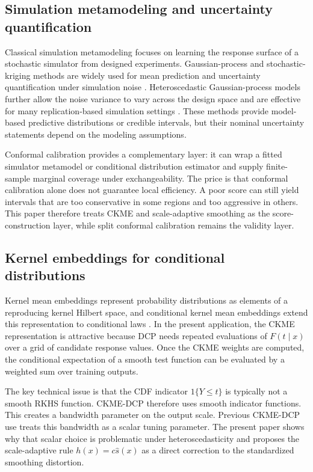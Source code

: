 \documentclass[11pt]{article}
\begin{document}
\subsection{Simulation metamodeling and uncertainty quantification}

Classical simulation metamodeling focuses on learning the response surface of a stochastic simulator from designed experiments. Gaussian-process and stochastic-kriging methods are widely used for mean prediction and uncertainty quantification under simulation noise \cite{sacks1989,ankenman2010}. Heteroscedastic Gaussian-process models further allow the noise variance to vary across the design space and are effective for many replication-based simulation settings \cite{binois2018}. These methods provide model-based predictive distributions or credible intervals, but their nominal uncertainty statements depend on the modeling assumptions.

Conformal calibration provides a complementary layer: it can wrap a fitted simulator metamodel or conditional distribution estimator and supply finite-sample marginal coverage under exchangeability. The price is that conformal calibration alone does not guarantee local efficiency. A poor score can still yield intervals that are too conservative in some regions and too aggressive in others. This paper therefore treats CKME and scale-adaptive smoothing as the score-construction layer, while split conformal calibration remains the validity layer.

\subsection{Kernel embeddings for conditional distributions}

Kernel mean embeddings represent probability distributions as elements of a reproducing kernel Hilbert space, and conditional kernel mean embeddings extend this representation to conditional laws \cite{song2013,muandet2017}. In the present application, the CKME representation is attractive because DCP needs repeated evaluations of \(F(t\mid x)\) over a grid of candidate response values. Once the CKME weights are computed, the conditional expectation of a smooth test function can be evaluated by a weighted sum over training outputs.

The key technical issue is that the CDF indicator \(1\{Y\le t\}\) is typically not a smooth RKHS function. CKME-DCP therefore uses smooth indicator functions. This creates a bandwidth parameter on the output scale. Previous CKME-DCP use treats this bandwidth as a scalar tuning parameter. The present paper shows why that scalar choice is problematic under heteroscedasticity and proposes the scale-adaptive rule \(h(x)=c\widehat s(x)\) as a direct correction to the standardized smoothing distortion.
\end{document}
